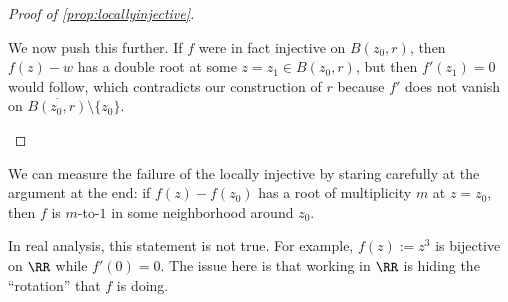 \begin{proof}[Proof of \autoref{prop:locallyinjective}]
\begin{itemize}
		We now push this further. If $f$ were in fact injective on $B(z_0,r)$, then $f(z)-w$ has a double root at some $z=z_1\in B(z_0,r)$, but then $f'(z_1)=0$ would follow, which contradicts our construction of $r$ because $f'$ does not vanish on $\overline{B(z_0,r)}\setminus\{z_0\}$.
		\qedhere
	\end{itemize}
\end{proof}
\begin{remark}
	We can measure the failure of the locally injective by staring carefully at the argument at the end: if $f(z)-f(z_0)$ has a root of multiplicity $m$ at $z=z_0$, then $f$ is $m$-to-$1$ in some neighborhood around $z_0$. 
\end{remark}
\begin{nex}
	In real analysis, this statement is not true. For example, $f(z):=z^3$ is bijective on $\RR$ while $f'(0)=0$. The issue here is that working in $\RR$ is hiding the ``rotation'' that $f$ is doing.
\end{nex}

